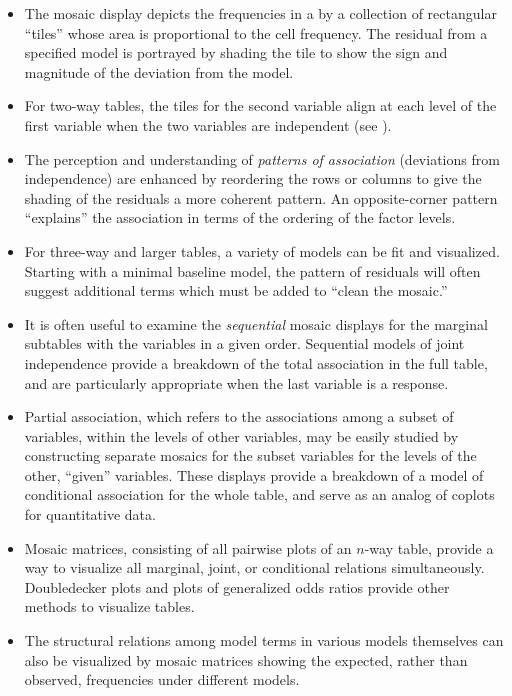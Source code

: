 \begin{itemize}
\item The mosaic display depicts the frequencies in a \ctab{} by a collection of rectangular ``tiles''
whose area is proportional to the cell frequency.
The residual from a specified model is portrayed by shading the tile
to show the sign and magnitude of the deviation from the model.

\item For two-way tables, the tiles for the second variable align
at each level of the first variable when the two variables are independent
(see ).

\item The perception and understanding of \emph{patterns of association}
(deviations from independence) are enhanced by reordering the
rows or columns to give the shading of the residuals a more
coherent pattern.  An opposite-corner pattern ``explains''
the association in terms of the ordering of the factor levels.

\item For three-way and larger tables, a variety of models can be fit
and visualized.
Starting with a minimal baseline model, the pattern of residuals
will often suggest additional terms which must be added to
``clean the mosaic.''

\item It is often useful to examine the \emph{sequential} mosaic
displays for the marginal subtables with the variables in a given order.
Sequential models of joint independence provide a breakdown of the
total association in the full table, and are particularly
appropriate when the last variable is a response.

\item Partial association, which refers to the associations among
a subset of variables, within the levels of other variables,
may be easily studied by constructing separate mosaics for the subset
variables for the levels of the other, ``given'' variables.
These displays provide a breakdown of a model of conditional association
for the whole table, and serve as an analog of coplots for quantitative
data.

\item Mosaic matrices, consisting of all pairwise plots of an $n$-way
table, provide a way to visualize all marginal, joint, or conditional 
relations simultaneously.  
Doubledecker plots and plots of generalized odds ratios provide other
methods to visualize \nway tables.

\item The structural relations among model terms in various \loglin
models themselves can also be visualized by mosaic matrices
showing the expected, rather than observed, frequencies under different
models.
\end{itemize}

